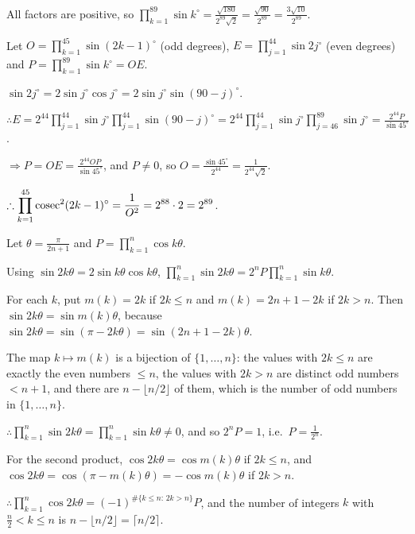   All factors are positive, so $\displaystyle\prod_{k = 1}^{89}\sin k^\circ = \frac{\sqrt{180}}{2^{89}\sqrt{2}}
  = \frac{\sqrt{90}}{2^{89}} = \frac{3\sqrt{10}}{2^{89}}$.
\item Let $O = \displaystyle\prod_{k = 1}^{45}\sin(2k - 1)^\circ$ (odd degrees), $E = \prod_{j = 1}^{44}\sin
  2j^\circ$ (even degrees) and $P = \prod_{k = 1}^{89}\sin k^\circ = OE$.

  $\sin2j^\circ = 2\sin j^\circ\cos j^\circ = 2\sin j^\circ\sin(90 - j)^\circ$.

  $\therefore E = 2^{44}\displaystyle\prod_{j = 1}^{44}\sin j^\circ\prod_{j = 1}^{44}\sin(90 - j)^\circ
  = 2^{44}\prod_{j = 1}^{44}\sin j^\circ\prod_{j = 46}^{89}\sin j^\circ = \frac{2^{44}P}{\sin45^\circ}$.

  $\Rightarrow P = OE = \frac{2^{44}OP}{\sin45^\circ}$, and $P\neq 0$, so $O = \frac{\sin45^\circ}{2^{44}}
  = \frac{1}{2^{44}\sqrt{2}}$.

  $\therefore \displaystyle\prod_{k = 1}^{45}{\rm cosec}^2(2k - 1)^\circ = \frac{1}{O^2} = 2^{88}\cdot 2 = 2^{89}$.
\item Let $\theta = \frac{\pi}{2n + 1}$ and $P = \displaystyle\prod_{k = 1}^{n}\cos k\theta$.

  Using $\sin2k\theta = 2\sin k\theta\cos k\theta$, $\displaystyle\prod_{k = 1}^{n}\sin2k\theta = 2^nP\prod_{k =
    1}^{n}\sin k\theta$.

  For each $k$, put $m(k) = 2k$ if $2k\leq n$ and $m(k) = 2n + 1 - 2k$ if $2k > n$. Then $\sin2k\theta =
  \sin m(k)\theta$, because $\sin2k\theta = \sin(\pi - 2k\theta) = \sin(2n + 1 - 2k)\theta$.

  The map $k\mapsto m(k)$ is a bijection of $\{1, \ldots, n\}$: the values with $2k\leq n$ are exactly the even
  numbers $\leq n$, the values with $2k > n$ are distinct odd numbers $< n + 1$, and there are $n - \lfloor
  n/2\rfloor$ of them, which is the number of odd numbers in $\{1, \ldots, n\}$.

  $\therefore \displaystyle\prod_{k = 1}^{n}\sin2k\theta = \prod_{k = 1}^{n}\sin k\theta\neq 0$, and so $2^nP =
  1$, i.e.\ $P = \frac{1}{2^n}$.

  For the second product, $\cos2k\theta = \cos m(k)\theta$ if $2k\leq n$, and $\cos2k\theta = \cos(\pi - m(k)\theta)
  = -\cos m(k)\theta$ if $2k > n$.

  $\therefore \displaystyle\prod_{k = 1}^{n}\cos2k\theta = (-1)^{\#\{k\leq n:\, 2k > n\}}P$, and the number of
  integers $k$ with $\frac{n}{2} < k\leq n$ is $n - \lfloor n/2\rfloor = \lceil n/2\rceil$.

